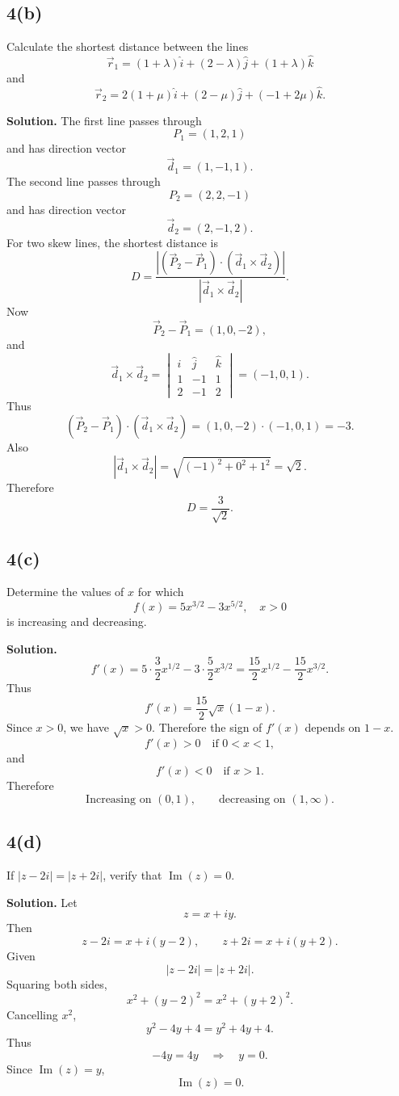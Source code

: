 \documentclass[11pt,a4paper]{article}
\newcommand{\ans}{\textbf{Solution.} }
\newcommand{\final}[1]{\[\boxed{#1}\]}
\begin{document}
\subsection*{4(b)}
\begin{questionbox}
Calculate the shortest distance between the lines
\[
\vec r_1=(1+\lambda)\hat i+(2-\lambda)\hat j+(1+\lambda)\hat k
\]
and
\[
\vec r_2=2(1+\mu)\hat i+(2-\mu)\hat j+(-1+2\mu)\hat k.
\]
\end{questionbox}
\ans
The first line passes through
\[
P_1=(1,2,1)
\]
and has direction vector
\[
\vec d_1=(1,-1,1).
\]
The second line passes through
\[
P_2=(2,2,-1)
\]
and has direction vector
\[
\vec d_2=(2,-1,2).
\]
For two skew lines, the shortest distance is
\[
D=\frac{|(\vec P_2-\vec P_1)\cdot(\vec d_1\times\vec d_2)|}{|\vec d_1\times\vec d_2|}.
\]
Now
\[
\vec P_2-\vec P_1=(1,0,-2),
\]
and
\[
\vec d_1\times\vec d_2=\begin{vmatrix}
\hat i&\hat j&\hat k\\1&-1&1\\2&-1&2
\end{vmatrix}=(-1,0,1).
\]
Thus
\[
(\vec P_2-\vec P_1)\cdot(\vec d_1\times\vec d_2)
=(1,0,-2)\cdot(-1,0,1)=-3.
\]
Also
\[
|\vec d_1\times\vec d_2|=\sqrt{(-1)^2+0^2+1^2}=\sqrt2.
\]
Therefore
\final{D=\frac{3}{\sqrt2}.}

\subsection*{4(c)}
\begin{questionbox}
Determine the values of $x$ for which
\[
f(x)=5x^{3/2}-3x^{5/2},\quad x>0
\]
is increasing and decreasing.
\end{questionbox}
\ans
\[
f'(x)=5\cdot\frac32x^{1/2}-3\cdot\frac52x^{3/2}
=\frac{15}{2}x^{1/2}-\frac{15}{2}x^{3/2}.
\]
Thus
\[
f'(x)=\frac{15}{2}\sqrt{x}(1-x).
\]
Since $x>0$, we have $\sqrt{x}>0$. Therefore the sign of $f'(x)$ depends on $1-x$.
\[
f'(x)>0 \quad \text{if } 0<x<1,
\]
and
\[
f'(x)<0 \quad \text{if } x>1.
\]
Therefore
\final{\text{Increasing on }(0,1),\qquad \text{decreasing on }(1,\infty).}

\subsection*{4(d)}
\begin{questionbox}
If $|z-2i|=|z+2i|$, verify that $\operatorname{Im}(z)=0$.
\end{questionbox}
\ans
Let
\[
z=x+iy.
\]
Then
\[
z-2i=x+i(y-2),
\qquad
z+2i=x+i(y+2).
\]
Given
\[
|z-2i|=|z+2i|.
\]
Squaring both sides,
\[
x^2+(y-2)^2=x^2+(y+2)^2.
\]
Cancelling $x^2$,
\[
y^2-4y+4=y^2+4y+4.
\]
Thus
\[
-4y=4y \quad\Rightarrow\quad y=0.
\]
Since $\operatorname{Im}(z)=y$,
\final{\operatorname{Im}(z)=0.}
\end{document}
